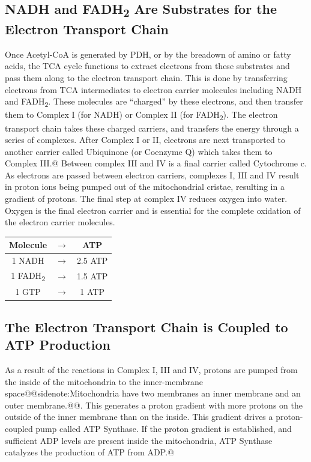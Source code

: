 \documentclass{tufte-handout}
\makeatletter
\def\sidenote#1{@@sidenote:#1@@}
\makeatother
\begin{document}
\subsection{NADH and FADH\textsubscript{2} Are Substrates for the Electron Transport Chain}
Once Acetyl-CoA is generated by PDH, or by the breadown of amino or fatty acids, the TCA cycle functions to extract electrons from these substrates and pass them along to the electron transport chain.  This is done by transferring electrons from TCA intermediates to electron carrier molecules including NADH and FADH\textsubscript{2}.  These molecules are ``charged'' by these electrons, and then transfer them to Complex I (for NADH) or Complex II (for FADH\textsubscript{2}).  The electron transport chain takes these charged carriers, and transfers the energy through a series of complexes.  After Complex I or II, electrons are next transported to another carrier called Ubiquinone (or Coenzyme Q) which takes them to Complex III.@  Between complex III and IV is a final carrier called Cytochrome c.  As electrons are passed between electron carriers, complexes I, III and IV result in proton ions being pumped out of the mitochondrial cristae, resulting in a gradient of protons.  The final step at complex IV reduces oxygen into water.  Oxygen is the final electron carrier and is essential for the complete oxidation of the electron carrier molecules.

\begin{margintable}
\centering
\caption{ATP producing equivalents.}\label{tab:atp-equivalents}
\begin{tabular}{ccc}
\hline
\textbf {Molecule} & $\rightarrow$ & \textbf{ATP}\\
\hline
1 NADH & $\rightarrow$ & 2.5 ATP \\
1 FADH\textsubscript{2} & $\rightarrow$ &  1.5 ATP  \\
1 GTP & $\rightarrow$ &  1 ATP  \\
\hline
\end{tabular}
\end{margintable}

\subsection{The Electron Transport Chain is Coupled to ATP Production}

As a result of the reactions in Complex I, III and IV, protons are pumped from the inside of the mitochondria to the inner-membrane space\sidenote{Mitochondria have two membranes an inner membrane and an outer membrane.}.  This generates a proton gradient with more protons on the outside of the inner membrane than on the inside.  This gradient drives a proton-coupled pump called ATP Synthase.  If the proton gradient is established, and sufficient ADP levels are present inside the mitochondria, ATP Synthase catalyzes the production of ATP from ADP.@
\end{document}
